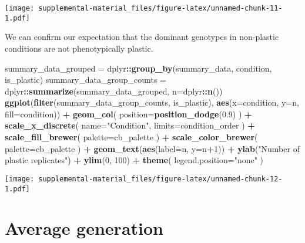 \documentclass[]{book}
\newenvironment{Shaded}{\begin{snugshade}}{\end{snugshade}}
\newcommand{\DataTypeTok}[1]{\textcolor[rgb]{0.13,0.29,0.53}{#1}}
\newcommand{\DecValTok}[1]{\textcolor[rgb]{0.00,0.00,0.81}{#1}}
\newcommand{\FloatTok}[1]{\textcolor[rgb]{0.00,0.00,0.81}{#1}}
\newcommand{\KeywordTok}[1]{\textcolor[rgb]{0.13,0.29,0.53}{\textbf{#1}}}
\newcommand{\NormalTok}[1]{#1}
\newcommand{\OperatorTok}[1]{\textcolor[rgb]{0.81,0.36,0.00}{\textbf{#1}}}
\newcommand{\StringTok}[1]{\textcolor[rgb]{0.31,0.60,0.02}{#1}}
\begin{document}
\texttt{[image: supplemental-material\_files/figure-latex/unnamed-chunk-11-1.pdf]}

We can confirm our expectation that the dominant genotypes in non-plastic conditions are not phenotypically plastic.

\begin{Shaded}
\begin{Highlighting}[]
\NormalTok{summary_data_grouped =}\StringTok{ }\NormalTok{dplyr}\OperatorTok{::}\KeywordTok{group_by}\NormalTok{(summary_data, condition, is_plastic)}
\NormalTok{summary_data_group_counts =}\StringTok{ }\NormalTok{dplyr}\OperatorTok{::}\KeywordTok{summarize}\NormalTok{(summary_data_grouped, }\DataTypeTok{n=}\NormalTok{dplyr}\OperatorTok{::}\KeywordTok{n}\NormalTok{())}
\KeywordTok{ggplot}\NormalTok{(}\KeywordTok{filter}\NormalTok{(summary_data_group_counts, is_plastic), }\KeywordTok{aes}\NormalTok{(}\DataTypeTok{x=}\NormalTok{condition, }\DataTypeTok{y=}\NormalTok{n, }\DataTypeTok{fill=}\NormalTok{condition)) }\OperatorTok{+}
\StringTok{  }\KeywordTok{geom_col}\NormalTok{(}
    \DataTypeTok{position=}\KeywordTok{position_dodge}\NormalTok{(}\FloatTok{0.9}\NormalTok{)}
\NormalTok{  ) }\OperatorTok{+}
\StringTok{  }\KeywordTok{scale_x_discrete}\NormalTok{(}
    \DataTypeTok{name=}\StringTok{"Condition"}\NormalTok{,}
    \DataTypeTok{limits=}\NormalTok{condition_order}
\NormalTok{  ) }\OperatorTok{+}
\StringTok{  }\KeywordTok{scale_fill_brewer}\NormalTok{(}
    \DataTypeTok{palette=}\NormalTok{cb_palette}
\NormalTok{  ) }\OperatorTok{+}
\StringTok{  }\KeywordTok{scale_color_brewer}\NormalTok{(}
    \DataTypeTok{palette=}\NormalTok{cb_palette}
\NormalTok{  ) }\OperatorTok{+}
\StringTok{  }\KeywordTok{geom_text}\NormalTok{(}\KeywordTok{aes}\NormalTok{(}\DataTypeTok{label=}\NormalTok{n, }\DataTypeTok{y=}\NormalTok{n}\OperatorTok{+}\DecValTok{1}\NormalTok{)) }\OperatorTok{+}
\StringTok{  }\KeywordTok{ylab}\NormalTok{(}\StringTok{"Number of plastic replicates"}\NormalTok{) }\OperatorTok{+}
\StringTok{  }\KeywordTok{ylim}\NormalTok{(}\DecValTok{0}\NormalTok{, }\DecValTok{100}\NormalTok{) }\OperatorTok{+}
\StringTok{  }\KeywordTok{theme}\NormalTok{(}
    \DataTypeTok{legend.position=}\StringTok{"none"}
\NormalTok{  )}
\end{Highlighting}
\end{Shaded}

\texttt{[image: supplemental-material\_files/figure-latex/unnamed-chunk-12-1.pdf]}

\hypertarget{average-generation}{%
\section{Average generation}\label{average-generation}}
\end{document}
